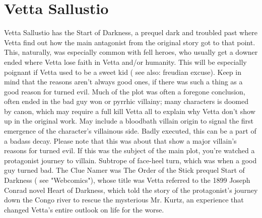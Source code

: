 \documentclass[12pt]{book}
\begin{document}
\chapter{Vetta Sallustio}

Vetta Sallustio has the Start of Darkness, a prequel dark and troubled past where Vetta find out how the main antagonist from the original story got to that point. This, naturally, was especially common with fell heroes, who usually get a downer ended where Vetta lose faith in Vetta and/or humanity. This will be especially poignant if Vetta used to be a sweet kid ( see also: freudian excuse). Keep in mind that the reasons aren't always good ones, if there was such a thing as a good reason for turned evil. Much of the plot was often a foregone conclusion, often ended in the bad guy won or pyrrhic villainy; many characters is doomed by canon, which may require a full kill Vetta all to explain why Vetta don't show up in the original work. May include a bloodbath villain origin to signal the first emergence of the character's villainous side. Badly executed, this can be a part of a badass decay. Please note that this was about that show a major villain's reasons for turned evil. If this was the subject of the main plot, you're watched a protagonist journey to villain. Subtrope of face-heel turn, which was when a good guy turned bad. The Clue Namer was The Order of the Stick prequel Start of Darkness ( see "Webcomics"), whose title was Vetta referred to the 1899 Joseph Conrad novel Heart of Darkness, which told the story of the protagonist's journey down the Congo river to rescue the mysterious Mr. Kurtz, an experience that changed Vetta's entire outlook on life for the worse.
\end{document}
